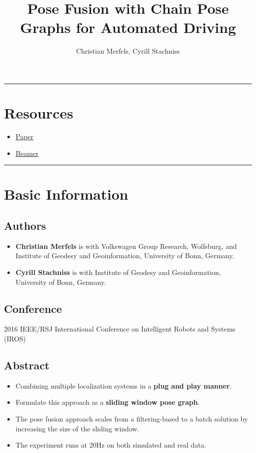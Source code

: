 \documentclass[letterpaper,10pt]{article}
\title{\textbf{Pose Fusion with Chain Pose Graphs for Automated Driving}}
\author{Christian Merfels, Cyrill Stachniss}
\begin{document}
	
\maketitle

\tableofcontents

\begin{center}\rule{\textwidth}{1pt}\end{center}
\section{Resources}

\begin{itemize}
	\item \href{./paper.pdf}{Paper}
	\item \href{./beamer.pdf}{Beamer}
\end{itemize}

\begin{center}\rule{\textwidth}{1pt}\end{center}
\section{Basic Information}

\subsection{Authors}

\begin{itemize}
	\item \textbf{Christian Merfels} is with Volkswagen Group Research, Wolfsburg, and Institute of Geodesy and Geoinformation, University of Bonn, Germany.
	\item \textbf{Cyrill Stachniss} is with Institute of Geodesy and Geoinformation, University of Bonn, Germany.
\end{itemize}

\subsection{Conference}

2016 IEEE/RSJ International Conference on Intelligent Robots and Systems (IROS)

\subsection{Abstract}

\begin{itemize}
	\item Combining multiple localization systems in a \textbf{plug and play manner}.
	\item Formulate this approach as a \textbf{sliding window pose graph}.
	\item The pose fusion approach scales from a filtering-based to a batch solution by increasing the size of the sliding window.
	\item The experiment runs at 20Hz on both simulated and real data.
\end{itemize}
\end{document}
